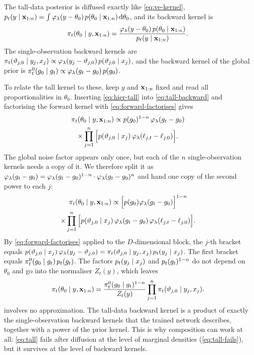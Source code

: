 The tall-data posterior is diffused exactly like \cref{eq:ve-kernel}, $p_t(y\mid\mathbf{x}_{1:n})=\int\varphi_\lambda(y-\theta_0)\,p(\theta_0\mid\mathbf{x}_{1:n})\,\mathrm{d}\theta_0$, and its backward kernel is
\begin{equation}\label{eq:tall-backward}
  \pi_t(\theta_0\mid y,\mathbf{x}_{1:n})=\frac{\varphi_\lambda(y-\theta_0)\,p(\theta_0\mid\mathbf{x}_{1:n})}{p_t(y\mid\mathbf{x}_{1:n})}.
\end{equation}
The single-observation backward kernels are $\pi_t(\vartheta_{j,0}\mid y_j,x_j)\propto\varphi_\lambda(y_j-\vartheta_{j,0})\,p(\vartheta_{j,0}\mid x_j)$, and the backward kernel of the global prior is $\pi^0_t(g_0\mid g_t)\propto\varphi_\lambda(g_t-g_0)\,p(g_0)$.

To relate the tall kernel to these, keep $y$ and $\mathbf{x}_{1:n}$ fixed and read all proportionalities in $\theta_0$.
Inserting \cref{eq:hier-tall} into \cref{eq:tall-backward} and factorising the forward kernel with \cref{eq:forward-factorises} gives
\begin{multline*}
  \pi_t(\theta_0\mid y,\mathbf{x}_{1:n})\propto p(g_0)^{1-n}\,\varphi_\lambda(g_t-g_0)\\
  \times\prod_{j=1}^n\Big[p(\vartheta_{j,0}\mid x_j)\,\varphi_\lambda(\ell_{j,t}-\ell_{j,0})\Big].
\end{multline*}
The global noise factor appears only once, but each of the $n$ single-observation kernels needs a copy of it.
We therefore split it as $\varphi_\lambda(g_t-g_0)=\varphi_\lambda(g_t-g_0)^{1-n}\cdot\varphi_\lambda(g_t-g_0)^{n}$ and hand one copy of the second power to each $j$:
\begin{multline*}
  \pi_t(\theta_0\mid y,\mathbf{x}_{1:n})\propto\Big[p(g_0)\varphi_\lambda(g_t-g_0)\Big]^{1-n}\\
  \times\prod_{j=1}^n\Big[p(\vartheta_{j,0}\mid x_j)\,\varphi_\lambda(g_t-g_0)\,\varphi_\lambda(\ell_{j,t}-\ell_{j,0})\Big].
\end{multline*}
By \cref{eq:forward-factorises} applied to the $D$-dimensional block, the $j$-th bracket equals $p(\vartheta_{j,0}\mid x_j)\,\varphi_\lambda(y_j-\vartheta_{j,0})=\pi_t(\vartheta_{j,0}\mid y_j,x_j)\,p_t(y_j\mid x_j)$.
The first bracket equals $\pi_t^0(g_0\mid g_t)\,p_t(g_t)$.
The factors $p_t(y_j\mid x_j)$ and $p_t(g_t)^{1-n}$ do not depend on $\theta_0$ and go into the normaliser $Z_t(y)$, which leaves
\begin{equation}\label{eq:backward-factorisation}
  \pi_t(\theta_0\mid y,\mathbf{x}_{1:n})=\frac{\pi^0_t(g_0\mid g_t)^{1-n}}{Z_t(y)}\prod_{j=1}^{n}\pi_t(\vartheta_{j,0}\mid y_j,x_j).
\end{equation}
 involves no approximation.
The tall-data backward kernel is a product of exactly the single-observation backward kernels that the trained network describes, together with a power of the prior kernel.
This is why composition can work at all: \cref{eq:tall} fails after diffusion at the level of marginal densities (\cref{eq:tall-fails}), but it survives at the level of backward kernels.

